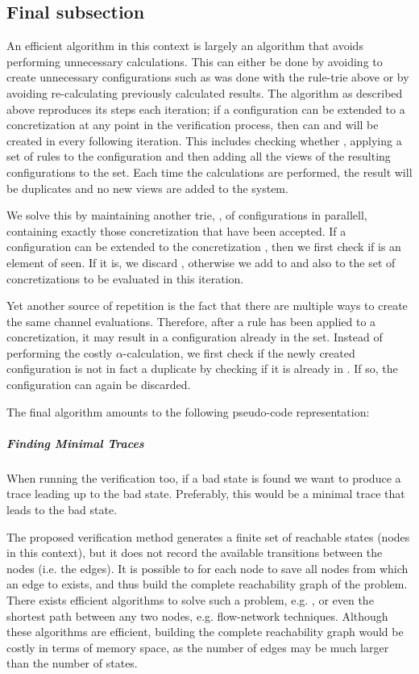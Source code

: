 \subsection{Final subsection}
An efficient algorithm in this context is largely an algorithm that avoids performing unnecessary calculations. This can either be done by avoiding to create unnecessary configurations such as was done with the rule-trie above or by avoiding re-calculating previously calculated results. The algorithm as described above reproduces its steps each iteration; if a configuration  can be extended to a concretization  at any point in the verification process, then  can and will be created in every following iteration. This includes checking whether , applying a set of rules to the configuration and then adding all the views of the resulting configurations to the set. Each time the calculations are performed, the result will be duplicates and no new views are added to the system.

We solve this by maintaining another trie, , of configurations in parallell, containing exactly those concretization that have been accepted. If a configuration  can be extended to the concretization , then we first check if  is an element of seen. If it is, we discard , otherwise we add  to  and also to the set of concretizations to be evaluated in this iteration.

Yet another source of repetition is the fact that there are multiple ways to create the same channel evaluations. Therefore, after a rule has been applied to a concretization, it may result in a configuration already in the set. Instead of performing the costly $\alpha$-calculation, we first check if the newly created configuration is not in fact a duplicate by checking if it is already in . If so, the configuration can again be discarded.

The final algorithm amounts to the following pseudo-code representation:

\subparagraph{Finding Minimal Traces}
When running the verification too, if a bad state is found we want to produce a trace leading up to the bad state. Preferably, this would be a minimal trace that leads to the bad state.
 
The proposed verification method generates a finite set of reachable states (nodes in this context), but it does not record the available transitions between the nodes (i.e. the edges). It is possible to for each node  to save all nodes  from which an edge to  exists, and thus build the complete reachability graph of the problem. There exists efficient algorithms to solve such a problem, e.g. , or even the shortest path between any two nodes, e.g. flow-network techniques. Although these algorithms are efficient, building the complete reachability graph would be costly in terms of memory space, as the number of edges may be much larger than the number of states.

